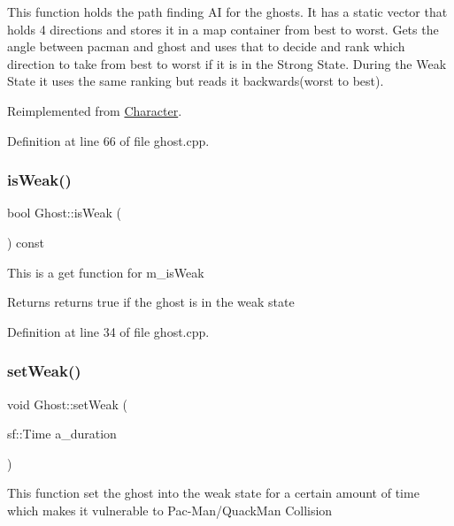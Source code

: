 This function holds the path finding AI for the ghosts. It has a static vector that holds 4 directions and stores it in a map container from best to worst. Gets the angle between pacman and ghost and uses that to decide and rank which direction to take from best to worst if it is in the Strong State. During the Weak State it uses the same ranking but reads it backwards(worst to best). 

Reimplemented from \hyperlink{class_character_ab4c0dc6f72c78607b921cf312e10ed35}{Character}.



Definition at line 66 of file ghost.\+cpp.

\mbox{\label{class_ghost_af0cf8b5a66a4a390746f43238b96fe55}} 
\subsubsection{\texorpdfstring{is\+Weak()}{isWeak()}}
{\footnotesize\ttfamily bool Ghost\+::is\+Weak (\begin{DoxyParamCaption}{ }\end{DoxyParamCaption}) const}

This is a get function for m\+\_\+is\+Weak

\begin{DoxyReturn}{Returns}
returns true if the ghost is in the weak state 
\end{DoxyReturn}


Definition at line 34 of file ghost.\+cpp.

\mbox{\label{class_ghost_ad3af3a46b5c130515dffaae54824341a}} 
\subsubsection{\texorpdfstring{set\+Weak()}{setWeak()}}
{\footnotesize\ttfamily void Ghost\+::set\+Weak (\begin{DoxyParamCaption}\item[{sf\+::\+Time}]{a\+\_\+duration }\end{DoxyParamCaption})}

This function set the ghost into the weak state for a certain amount of time which makes it vulnerable to Pac-\/\+Man/\+Quack\+Man Collision


